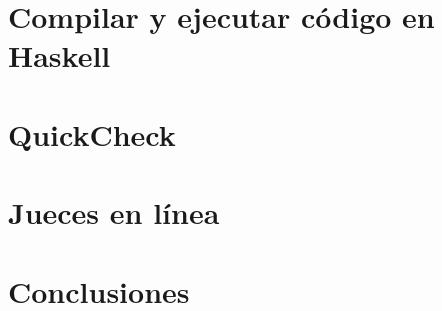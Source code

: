 \documentclass{book}
\begin{document}
    \chapter{Compilar y ejecutar código en Haskell}
        

    \chapter{QuickCheck}
        

    \chapter{Jueces en línea}
        
    
    \chapter{Conclusiones}
        


\backmatter
    \nocite{*}
    \printbibliography
\end{document}
